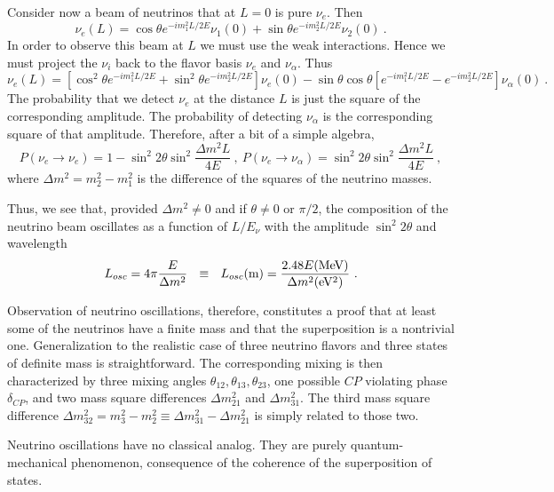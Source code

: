 \documentclass[aps,twocolumn,preprintnumbers,amsmath,superscriptaddress,amssymb,floats,nofootinbib]{revtex4-1}
\begin{document}
{{Consider now a beam of neutrinos that at $L=0$ is pure $\nu_e$. Then
\begin{equation}
\nu_e (L) = \cos \theta e^{-i m_1^2 L/2E} \nu_1(0) + \sin \theta e^{-i m_2^2 L/2E} \nu_2 (0) ~.
\end{equation}
In order to observe this beam at $L$ we must use the weak interactions. Hence we must project the $\nu_i$ back to the flavor basis $\nu_e$ and $\nu_{\alpha}$.
Thus
\begin{equation}
\nu_e (L) = [\cos^2 \theta e^{-i m_1^2 L/2E} + \sin^2 \theta e^{-i m_2^2 L/2E}] \nu_e(0) - 
\sin \theta \cos \theta [e^{-i m_1^2 L/2E} - e^{-i m_2^2 L/2E}] \nu_{\alpha}(0) ~.
\end{equation}
The probability that we detect $\nu_e$ at the distance $L$ is just the square of the corresponding amplitude. The probability
of detecting $\nu_{\alpha}$ is the corresponding square of that amplitude. Therefore, after a bit of a simple algebra,
\begin{equation}
P(\nu_e \rightarrow \nu_e) = 1 - \sin^2 2 \theta \sin^2 \frac{\Delta m^2 L}{4 E} ~,~ P(\nu_e \rightarrow \nu_{\alpha}) =  \sin^2 2 \theta \sin^2 \frac{\Delta m^2 L}{4 E} ~,
\end{equation}
where $\Delta m^2 = m^2_2 - m^2_1$ is the difference of the squares of the neutrino masses. 

Thus, we see that, provided $\Delta m^2 \ne 0$ and if $\theta \ne 0$ or $\pi/2$, the composition of the neutrino beam oscillates as a function of $L/E_{\nu}$ 
with the amplitude $\sin^2 2 \theta$ and wavelength
\begin{equation}
L_{osc} = 4 \pi \frac{E}{\Delta m^2} ~~\equiv ~~ L_{osc} ({\rm m}) = \frac{2.48 E {\rm (MeV)}}{ \Delta m^2 {\rm (eV^2)}} ~. 
\end{equation}

Observation of neutrino oscillations, therefore, constitutes a proof that at least some of the neutrinos have a finite mass and that the superposition is
a nontrivial one. Generalization to the realistic case of three neutrino flavors and three
states of definite mass is straightforward. The corresponding mixing is then characterized by three mixing angles $\theta_{12}, \theta_{13}, \theta_{23}$,
 one possible $CP$ violating phase $\delta_{CP}$,
and two mass square differences $\Delta m^2_{21}$ and  $\Delta m^2_{31}$. The third mass square difference 
$\Delta m^2_{32} = m^2_3 - m^2_2 \equiv \Delta m^2_{31} - \Delta m^2_{21}$ is simply related
to those two. 

Neutrino oscillations have no classical analog. They are purely quantum-mechanical phenomenon, consequence of the coherence of the
superposition of states.

    }%
}
\end{document}
